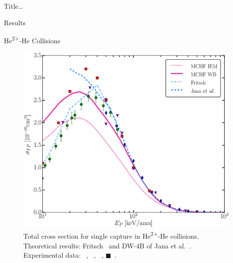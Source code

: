 \documentclass[letterpaper, 11 pt]{report}
\begin{document}
\begin{chapter}{ Title\dots \label{chap:p-he2p-he}}
\begin{section}{Results \label{sec:phe2p-res}}
\begin{subsection}{\texorpdfstring{He\textsuperscript{2+}}{He2+}-He Collisions 
                         \label{sec:he2phe-res}}
\begin{figure}[ht]
\begin{minipage}{.49\linewidth}
               \centering
               \includegraphics[width = \linewidth]{./images/he2phe/he2phe-TP.eps}
               \caption[Total cross section for single capture in He\textsuperscript{2+}-He
                        collisions.]{Total cross section for single capture in He\textsuperscript{2+}-He
                        collisions. Theoretical results: Fritsch~\cite{Fritsch-94} and DW-4B of Jana
                        et al.~\cite{JMP-15}.
                        Experimental data: {\color{blue}{$\blacklozenge$}}~\cite{SG85},
                        {\color{OliveGreen}{$\bullet$}}~\cite{SG89},
                        {\color{RedViolet}{$\blacktriangledown$}}~\cite{Dubois87},
                        {\color{red}$\blacksquare$}~\cite{Rudd85}. \label{fig:he2phe-tp}}
            \end{minipage}
         \end{figure}
         

\end{subsection}
\end{section}
\end{chapter}
\end{document}
